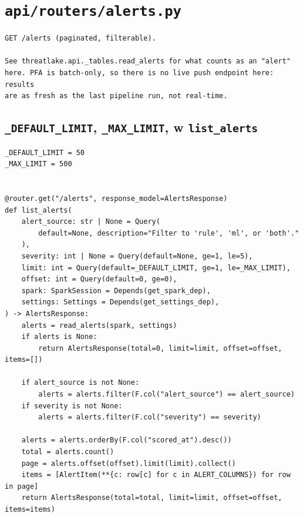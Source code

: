 \documentclass[11pt,a4paper]{report}
\DeclareRobustCommand{\code}[1]{\texttt{#1}}
\DeclareRobustCommand{\file}[1]{\texttt{\color{amber}#1}}
\begin{document}
\section{\file{api/routers/alerts.py}}

\begin{lstlisting}[style=pystyle]
GET /alerts (paginated, filterable).

See threatlake.api._tables.read_alerts for what counts as an "alert"
here. PFA is batch-only, so there is no live push endpoint here: results
are as fresh as the last pipeline run, not real-time.
\end{lstlisting}

\subsection{\code{\_DEFAULT\_LIMIT}, \code{\_MAX\_LIMIT}, w \code{list\_alerts}}

\begin{lstlisting}[style=pystyle]
_DEFAULT_LIMIT = 50
_MAX_LIMIT = 500


@router.get("/alerts", response_model=AlertsResponse)
def list_alerts(
    alert_source: str | None = Query(
        default=None, description="Filter to 'rule', 'ml', or 'both'."
    ),
    severity: int | None = Query(default=None, ge=1, le=5),
    limit: int = Query(default=_DEFAULT_LIMIT, ge=1, le=_MAX_LIMIT),
    offset: int = Query(default=0, ge=0),
    spark: SparkSession = Depends(get_spark_dep),
    settings: Settings = Depends(get_settings_dep),
) -> AlertsResponse:
    alerts = read_alerts(spark, settings)
    if alerts is None:
        return AlertsResponse(total=0, limit=limit, offset=offset, items=[])

    if alert_source is not None:
        alerts = alerts.filter(F.col("alert_source") == alert_source)
    if severity is not None:
        alerts = alerts.filter(F.col("severity") == severity)

    alerts = alerts.orderBy(F.col("scored_at").desc())
    total = alerts.count()
    page = alerts.offset(offset).limit(limit).collect()
    items = [AlertItem(**{c: row[c] for c in ALERT_COLUMNS}) for row in page]
    return AlertsResponse(total=total, limit=limit, offset=offset, items=items)
\end{lstlisting}
\end{document}
